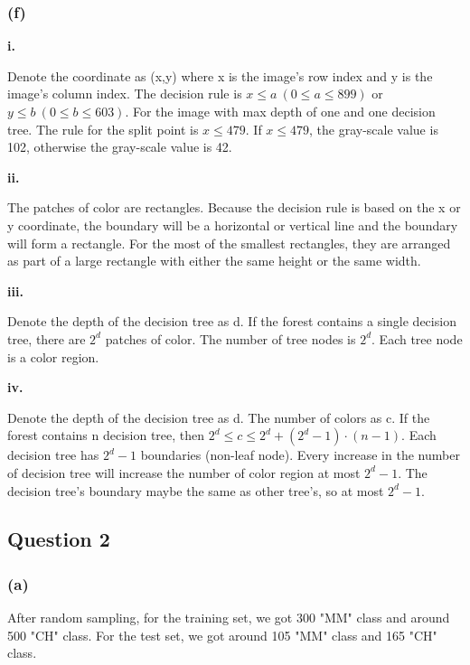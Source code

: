 \documentclass[12pt]{article}
\begin{document}
{\subsubsection*{(f)}
\textbf{i.}

Denote the coordinate as (x,y) where x is the image's row index and y is the image's column index. The decision rule is $x \leqslant a\ (0\leqslant a \leqslant 899)$ or $y \leqslant b\ (0\leqslant b \leqslant 603)$. For the image with max depth of one and one decision tree. The rule for the split point is $x \leqslant 479$. If $x \leqslant 479$, the gray-scale value is 102, otherwise the gray-scale value is 42.

\medskip
\textbf{ii.}

The patches of color are rectangles. Because the decision rule is based on the x or y coordinate, the boundary will be a horizontal or vertical line and the boundary will form a rectangle. For the most of the smallest rectangles, they are arranged as part of a large rectangle with either the same height or the same width.

\medskip
\textbf{iii.}

Denote the depth of the decision tree as d. If the forest contains a single decision tree, there are $2^d$ patches of color. The number of tree nodes is $2^d$. Each tree node is a color region.

\medskip
\textbf{iv.}

Denote the depth of the decision tree as d. The number of colors as c. If the forest contains n decision tree, then $2^d \leqslant c \leqslant 2^d+(2^{d}-1)\cdot(n-1)$. Each decision tree has $2^d-1$ boundaries (non-leaf node). Every increase in the number of decision tree will increase the number of color region at most $2^d-1$. The decision tree's boundary maybe the same as other tree's, so at most $2^d-1$.

\subsection*{Question 2}
\subsubsection*{(a)}
After random sampling, for the training set, we got 300 "MM" class and around 500 "CH" class. For the test set, we got around 105 "MM" class and 165 "CH" class. 

}
\end{document}
